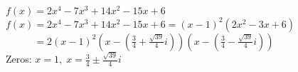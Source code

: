 {$f(x) = 2x^4-7x^3+14x^2-15x+6$}
{$f(x) = 2x^4-7x^3+14x^2-15x+6 = (x-1)^2 \left(2x^2 - 3x + 6\right)  $\\
$\phantom{f(x)} = 2 (x-1)^2 \left( x - \left( \frac{3}{4} +  \frac{\sqrt{39}}{4} i \right) \right)  \left( x - \left( \frac{3}{4} -  \frac{\sqrt{39}}{4} i \right) \right) $ \\
Zeros: $x = 1, \; x = \frac{3}{4}  \pm  \frac{\sqrt{39}}{4} i$}